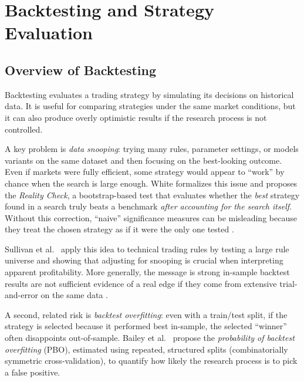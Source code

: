 
\section{Backtesting and Strategy Evaluation}
\label{sec:backtesting}

\subsection{Overview of Backtesting}

Backtesting evaluates a trading strategy by simulating its decisions on historical data.
It is useful for comparing strategies under the same market conditions, but it can also
produce overly optimistic results if the research process is not controlled.

A key problem is \emph{data snooping}: trying many rules, parameter settings, or models
variants on the same dataset and then focusing on the best-looking outcome.
Even if markets were fully efficient, some strategy would appear to ``work'' by chance
when the search is large enough. White \citep{white2000reality} formalizes this issue
and proposes the \emph{Reality Check}, a bootstrap-based test that evaluates whether the
\emph{best} strategy found in a search truly beats a benchmark \emph{after accounting for
the search itself}. Without this correction, ``naive'' significance measures can be
misleading because they treat the chosen strategy as if it were the only one tested
\citep{white2000reality}.

Sullivan et al.\ \citep{sullivan1999data} apply this idea to technical trading rules by
testing a large rule universe and showing that adjusting for snooping is crucial when
interpreting apparent profitability. More generally, the message is strong in-sample
backtest results are not sufficient evidence of a real edge if they come from extensive
trial-and-error on the same data \citep{sullivan1999data, white2000reality}.

A second, related risk is \emph{backtest overfitting}: even with a train/test split, if
the strategy is selected because it performed best in-sample, the selected ``winner''
often disappoints out-of-sample. Bailey et al.\ \citep{bailey2017probability} propose the
\emph{probability of backtest overfitting} (PBO), estimated using repeated, structured
splits (combinatorially symmetric cross-validation), to quantify how likely the research
process is to pick a false positive.

